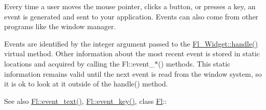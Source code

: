 Every time a user moves the mouse pointer, clicks a button, or presses a key, an event is generated and sent to your application. Events can also come from other programs like the window manager.

Events are identified by the integer argument passed to the \hyperlink{class_fl___widget_a3521aba25eda761620953dd49d335ea7}{Fl\+\_\+\+Widget\+::handle()} virtual method. Other information about the most recent event is stored in static locations and acquired by calling the Fl\+::event\+\_\+$\ast$() methods. This static information remains valid until the next event is read from the window system, so it is ok to look at it outside of the handle() method.

\begin{DoxySeeAlso}{See also}
\hyperlink{group__fl__events_ga6647c55948fe1d8be9367267529e9c54}{Fl\+::event\+\_\+text()}, \hyperlink{group__fl__events_ga1ac131e3cd5ca674cc022b1f77233449}{Fl\+::event\+\_\+key()}, class \hyperlink{class_fl}{Fl}\+:\+: 
\end{DoxySeeAlso}
